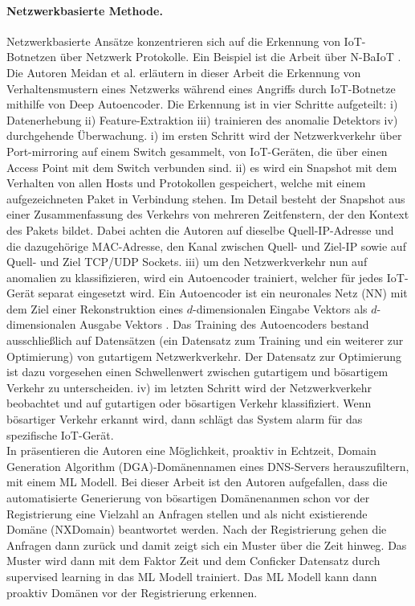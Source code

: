 \paragraph{Netzwerkbasierte Methode.} Netzwerkbasierte Ansätze konzentrieren sich auf die Erkennung von IoT-Botnetzen über Netzwerk Protokolle. Ein Beispiel ist die Arbeit über N-BaIoT \cite{DBLP:journals/pervasive/MeidanBMMSBE18}. Die Autoren Meidan et al. erläutern in dieser Arbeit die Erkennung von Verhaltensmustern eines Netzwerks während eines Angriffs durch IoT-Botnetze mithilfe von Deep Autoencoder. Die Erkennung ist in vier Schritte aufgeteilt: i) Datenerhebung ii) Feature-Extraktion iii) trainieren des anomalie Detektors iv) durchgehende Überwachung. i) im ersten Schritt wird der Netzwerkverkehr über Port-mirroring auf einem Switch gesammelt, von IoT-Geräten, die über einen Access Point mit dem Switch verbunden sind. ii) es wird ein Snapshot mit dem Verhalten von allen Hosts und Protokollen gespeichert, welche mit einem aufgezeichneten Paket in Verbindung stehen. Im Detail besteht der Snapshot aus einer Zusammenfassung des Verkehrs von mehreren Zeitfenstern, der den Kontext des Pakets bildet. Dabei achten die Autoren auf dieselbe Quell-IP-Adresse und die dazugehörige MAC-Adresse, den Kanal zwischen Quell- und Ziel-IP sowie auf Quell- und Ziel TCP/UDP Sockets. iii) um den Netzwerkverkehr nun auf anomalien zu klassifizieren, wird ein Autoencoder trainiert, welcher für jedes IoT-Gerät separat eingesetzt wird. Ein Autoencoder ist ein neuronales Netz (NN) mit dem Ziel einer Rekonstruktion eines $d$-dimensionalen Eingabe Vektors als $d$-dimensionalen Ausgabe Vektors \cite{herve_2022}. Das Training des Autoencoders bestand ausschließlich auf Datensätzen (ein Datensatz zum Training und ein weiterer zur Optimierung) von gutartigem Netzwerkverkehr. Der Datensatz zur Optimierung ist dazu vorgesehen einen Schwellenwert zwischen gutartigem und bösartigem Verkehr zu unterscheiden. iv) im letzten Schritt wird der Netzwerkverkehr beobachtet und auf gutartigen oder bösartigen Verkehr klassifiziert. Wenn bösartiger Verkehr erkannt wird, dann schlägt das System alarm für das spezifische IoT-Gerät. \\[0.2in] 

In \cite{DBLP:journals/ett/SpauldingPKNM19} präsentieren die Autoren eine Möglichkeit, proaktiv in Echtzeit, Domain Generation Algorithm (DGA)-Domänennamen eines DNS-Servers herauszufiltern, mit einem ML Modell. Bei dieser Arbeit ist den Autoren aufgefallen, dass die automatisierte Generierung von bösartigen Domänenanmen schon vor der Registrierung eine Vielzahl an Anfragen stellen und als nicht existierende Domäne (NXDomain) beantwortet werden. Nach der Registrierung gehen die Anfragen dann zurück und damit zeigt sich ein Muster über die Zeit hinweg. Das Muster wird dann mit dem Faktor Zeit und dem Conficker Datensatz \cite{DBLP:conf/www/ThomasM14} durch supervised learning in das ML Modell trainiert. Das ML Modell kann dann proaktiv Domänen vor der Registrierung erkennen. \\[0.2in]

